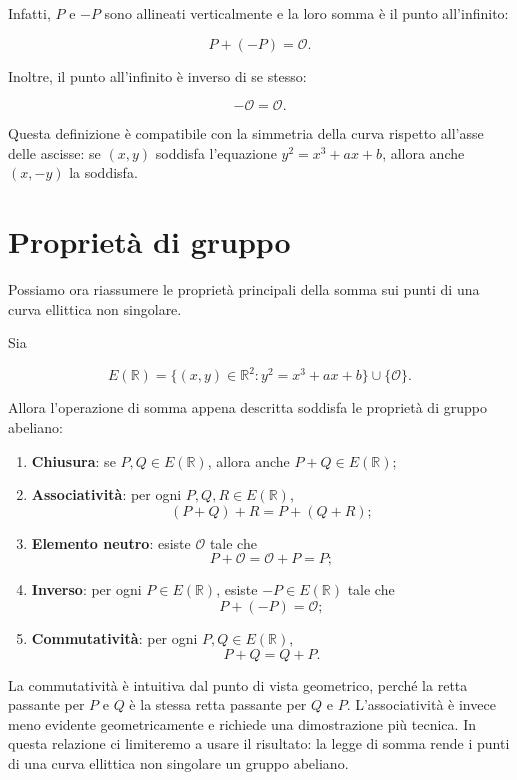 \documentclass[12pt,a4paper,oneside]{report}
\begin{document}
Infatti, \(P\) e \(-P\) sono allineati verticalmente e la loro somma è il punto all'infinito:

\begin{equation}
    P+(-P)=\mathcal{O}.
\end{equation}

Inoltre, il punto all'infinito è inverso di se stesso:

\begin{equation}
    -\mathcal{O}=\mathcal{O}.
\end{equation}

Questa definizione è compatibile con la simmetria della curva rispetto all'asse delle ascisse: se \((x,y)\) soddisfa l'equazione \(y^2=x^3+ax+b\), allora anche \((x,-y)\) la soddisfa.

\section{Proprietà di gruppo}

Possiamo ora riassumere le proprietà principali della somma sui punti di una curva ellittica non singolare.

Sia

\[
E(\mathbb{R}) = \{(x,y)\in\mathbb{R}^2 : y^2=x^3+ax+b\}\cup\{\mathcal{O}\}.
\]

Allora l'operazione di somma appena descritta soddisfa le proprietà di gruppo abeliano:

\begin{enumerate}
    \item \textbf{Chiusura}: se \(P,Q \in E(\mathbb{R})\), allora anche \(P+Q \in E(\mathbb{R})\);
    \item \textbf{Associatività}: per ogni \(P,Q,R \in E(\mathbb{R})\),
    \[
    (P+Q)+R=P+(Q+R);
    \]
    \item \textbf{Elemento neutro}: esiste \(\mathcal{O}\) tale che
    \[
    P+\mathcal{O}=\mathcal{O}+P=P;
    \]
    \item \textbf{Inverso}: per ogni \(P\in E(\mathbb{R})\), esiste \(-P\in E(\mathbb{R})\) tale che
    \[
    P+(-P)=\mathcal{O};
    \]
    \item \textbf{Commutatività}: per ogni \(P,Q \in E(\mathbb{R})\),
    \[
    P+Q=Q+P.
    \]
\end{enumerate}

La commutatività è intuitiva dal punto di vista geometrico, perché la retta passante per \(P\) e \(Q\) è la stessa retta passante per \(Q\) e \(P\). L'associatività è invece meno evidente geometricamente e richiede una dimostrazione più tecnica. In questa relazione ci limiteremo a usare il risultato: la legge di somma rende i punti di una curva ellittica non singolare un gruppo abeliano.
\end{document}

